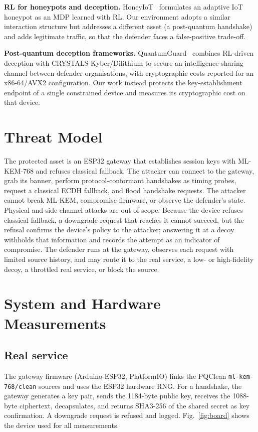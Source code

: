 \documentclass[conference]{IEEEtran}
\begin{document}
\textbf{RL for honeypots and deception.} HoneyIoT~\cite{honeyiot} formulates an
adaptive IoT honeypot as an MDP learned with RL. Our environment adopts a similar
interaction structure but addresses a different asset (a post-quantum handshake)
and adds legitimate traffic, so that the defender faces a false-positive trade-off.

\textbf{Post-quantum deception frameworks.} QuantumGuard~\cite{quantumguard}
combines RL-driven deception with CRYSTALS-Kyber/Dilithium to secure an
intelligence-sharing channel between defender organisations, with cryptographic
costs reported for an x86-64/AVX2 configuration. Our work instead protects the
key-establishment endpoint of a single constrained device and measures its
cryptographic cost on that device.

\section{Threat Model}
The protected asset is an ESP32 gateway that establishes session keys with
ML-KEM-768 and refuses classical fallback. The attacker can connect to the
gateway, grab its banner, perform protocol-conformant handshakes as timing probes,
request a classical ECDH fallback, and flood handshake requests. The attacker
cannot break ML-KEM, compromise firmware, or observe the defender's state.
Physical and side-channel attacks are out of scope. Because the device refuses
classical fallback, a downgrade request that reaches it cannot succeed, but the
refusal confirms the device's policy to the attacker; answering it at a decoy
withholds that information and records the attempt as an indicator of compromise.
The defender runs at the
gateway, observes each request with limited source history, and may route it to
the real service, a low- or high-fidelity decoy, a throttled real service, or
block the source.

\section{System and Hardware Measurements}
\subsection{Real service}
The gateway firmware (Arduino-ESP32, PlatformIO) links the PQClean
\texttt{ml-kem-768/clean} sources and uses the ESP32 hardware RNG. For a
handshake, the gateway generates a key pair, sends the 1184-byte public key,
receives the 1088-byte ciphertext, decapsulates, and returns SHA3-256 of the
shared secret as key confirmation. A downgrade request is refused and logged.
Fig.~\ref{fig:board} shows the device used for all measurements.
\end{document}
